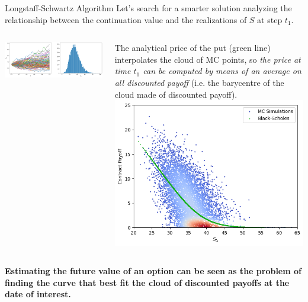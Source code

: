 \documentclass{beamer}
\begin{document}
\begin{frame}{Longstaff-Schwartz Algorithm}
Let's search for a smarter solution analyzing the relationship between the continuation value and the realizations of $S$ at step $t_1$.
\begin{columns}
    \includegraphics[width=0.9\linewidth]{images/longstaff_simulation}
    
    \small{The analytical price of the put (green line) interpolates the cloud of MC points, so \emph{the price at time $t_1$ can be computed by means of an average on all discounted payoff} (i.e. the barycentre of the cloud made of discounted payoff).}
    \includegraphics[width=0.9\linewidth]{images/longstaff_scatter_1}
\end{columns}

\textbf{Estimating the future value of an option can be seen as the problem of finding the curve that best fit the cloud of discounted payoffs at the date of interest.}
\end{frame}
\end{document}
